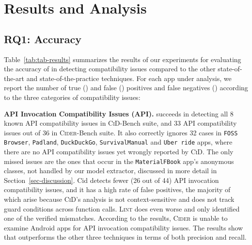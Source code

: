 

\section{Results and Analysis}
\label{sec-results}

 

\subsection{RQ1: Accuracy}


Table~\ref{tab:tab-results} summarizes the results of our
experiments for evaluating the accuracy of \@approach in
detecting compatibility issues compared to the other
state-of-the-art and state-of-the-practice techniques.  For
each app under analysis, we report the number of true (\tp)
and false (\fp) positives and false negatives (\fn)
according to the three categories of compatibility issues:

\textbf{API Invocation Compatibility Issues (API).}
\@approach succeeds in detecting all 8 known API
compatibility issues in \textsc{CiD}-Bench suite, and 33 API
compatibility issues out of 36 in \textsc{Cider}-Bench
suite.  It also correctly ignores 32 cases in \texttt{FOSS
Browser}, \texttt{Padland}, \texttt{DuckDuckGo},
\texttt{SurvivalManual} and \texttt{Uber~ride} apps, where
there are no API compatibility issues yet wrongly reported
by \textsc{CiD}. The only missed issues are the ones that
occur in the \texttt{MaterialFBook} app's anonymous classes,
not handled by our model extractor, discussed in more detail
in Section~\ref{sec-discussion}.  {\sc Cid} detects fewer
(26 out of 44) API invocation compatibility issues, and it has a high rate of
false positives, the majority of which arise because
\textsc{CiD}'s analysis is not context-sensitive and does
not track guard conditions across function calls.
\textsc{Lint} does even worse and only identified one of the
verified mismatches.  According to the results,
\textsc{Cider} is unable to examine Android apps for API
invocation compatibility issues. The results show that
\@approach outperforms the other three techniques in terms
of both precision and recall.


